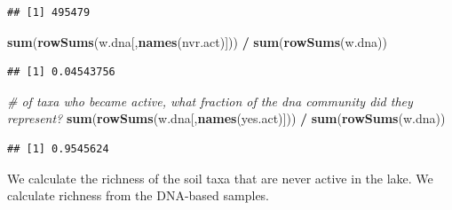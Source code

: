 \documentclass[]{article}
\newenvironment{Shaded}{\begin{snugshade}}{\end{snugshade}}
\newcommand{\CommentTok}[1]{\textcolor[rgb]{0.56,0.35,0.01}{\textit{#1}}}
\newcommand{\KeywordTok}[1]{\textcolor[rgb]{0.13,0.29,0.53}{\textbf{#1}}}
\newcommand{\NormalTok}[1]{#1}
\newcommand{\OperatorTok}[1]{\textcolor[rgb]{0.81,0.36,0.00}{\textbf{#1}}}
\newcommand{\StringTok}[1]{\textcolor[rgb]{0.31,0.60,0.02}{#1}}
\begin{document}
\begin{verbatim}
## [1] 495479
\end{verbatim}

\begin{Shaded}
\begin{Highlighting}[]
\KeywordTok{sum}\NormalTok{(}\KeywordTok{rowSums}\NormalTok{(w.dna[,}\KeywordTok{names}\NormalTok{(nvr.act)])) }\OperatorTok{/}\StringTok{ }\KeywordTok{sum}\NormalTok{(}\KeywordTok{rowSums}\NormalTok{(w.dna))}
\end{Highlighting}
\end{Shaded}

\begin{verbatim}
## [1] 0.04543756
\end{verbatim}

\begin{Shaded}
\begin{Highlighting}[]
\CommentTok{# of taxa who became active, what fraction of the dna community did they represent?}
\KeywordTok{sum}\NormalTok{(}\KeywordTok{rowSums}\NormalTok{(w.dna[,}\KeywordTok{names}\NormalTok{(yes.act)])) }\OperatorTok{/}\StringTok{ }\KeywordTok{sum}\NormalTok{(}\KeywordTok{rowSums}\NormalTok{(w.dna))}
\end{Highlighting}
\end{Shaded}

\begin{verbatim}
## [1] 0.9545624
\end{verbatim}

\begin{Shaded}
\end{Shaded}

We calculate the richness of the soil taxa that are never active in the
lake. We calculate richness from the DNA-based samples.
\end{document}
